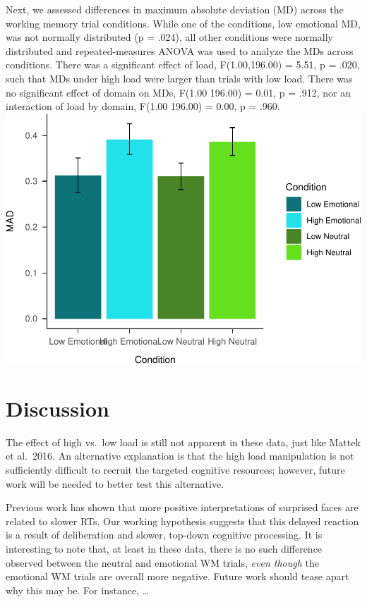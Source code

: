\documentclass[man]{apa6}
\begin{document}
Next, we assessed differences in maximum absolute deviation (MD) across the working memory trial conditions. While one of the conditions, low emotional MD, was not normally distributed (p = .024), all other conditions were normally distributed and repeated-measures ANOVA was used to analyze the MDs across conditions. There was a significant effect of load, F(1.00,196.00) = 5.51, p = .020, such that MDs under high load were larger than trials with low load. There was no significant effect of domain on MDs, F(1.00 196.00) = 0.01, p = .912, nor an interaction of load by domain, F(1.00 196.00) = 0.00, p = .960.
\includegraphics{Manuscript_files/figure-latex/MAD plot-1.pdf}

\hypertarget{discussion}{%
\section{Discussion}\label{discussion}}

The effect of high vs.~low load is still not apparent in these data, just like Mattek et al.~2016. An alternative explanation is that the high load manipulation is not sufficiently difficult to recruit the targeted cognitive resources; however, future work will be needed to better test this alternative.

Previous work has shown that more positive interpretations of surprised faces are related to slower RTs. Our working hypothesis suggests that this delayed reaction is a result of deliberation and slower, top-down cognitive processing. It is interesting to note that, at least in these data, there is no such difference observed between the neutral and emotional WM trials, \emph{even though} the emotional WM trials are overall more negative. Future work should tease apart why this may be. For instance, \ldots{}
\end{document}
